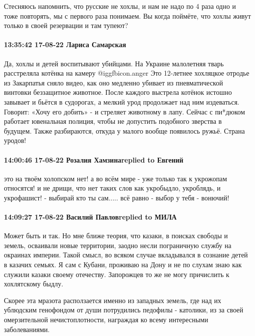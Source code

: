 Стесняюсь напомнить, что русские не хохлы, и нам не надо по 4 раза одно и тоже
повторять, мы с первого раза понимаем.
Вы когда поймёте, что хохлы живут только в своей резервации и там тупеют?

\paragraph{13:35:42 17-08-22 Лариса Самарская}

\obeycr
Да, хохлы и детей воспитывают убийцами.
На Украине малолетняя тварь расстреляла котёнка на камеру @igg{fbicon.anger} 
Это 12-летнее хохляцкое отродье из Закарпатья сняло видео, как оно медленно убивает из пневматической винтовки беззащитное животное.
После каждого выстрела котёнок истошно завывает и бьётся в судорогах, а мелкий урод продолжает над ним издеваться. Говорит: «Хочу его добить» - и стреляет животному в лапу.
Сейчас с пи*дюком работает ювенальная полиция, чтобы не допустить подобного зверства в будущем. Также разбираются, откуда у малого вообще появилось ружьё.
Страна уродов!🤬
\restorecr

\paragraph{14:00:46 17-08-22 Розалия Хамзинаreplied to Евгений}

это на твоём холопском нет! а во всём мире - уже только так к укрожопам
относятся! и не дрищи, что нет таких слов как укробыдло, укроблядь, и
укрофашист! - выбирай кто ты сам..... всё равно - выбор у тебя - вонючий!

\paragraph{14:09:27 17-08-22 Василий Павловreplied to МИЛА}

Может быть и так. Но мне ближе теория, что казаки, в поисках свободы и земель,
осваивали новые территории, заодно несли пограничную службу на окраинах
империи. Такой смысл, во всяком случае вкладывался в сознание детей в казачих
семьях. Я сам с Кубани, проживаю на Дону и не по слухам знаю как служили казаки
своему отечеству. Запорожцев то же не могу причислить к хохлятскому быдлу.

Скорее эта мразота расползается именно из западных земель, где над их ублюдским
генофондом от души потрудились педофилы - католики, из за своей омерзительной
нечистоплотности, награждая ко всему интересными заболеваниями.
